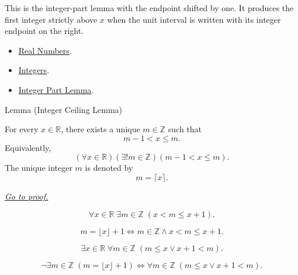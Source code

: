 \begin{remark*}[Interpretation]
This is the integer-part lemma with the endpoint shifted by one.  It produces
the first integer strictly above $x$ when the unit interval is written with its
integer endpoint on the right.
\end{remark*}

\begin{dependencies}
\begin{itemize}
\item \hyperref[def:reals]{Real Numbers}.
\item \hyperref[def:integers]{Integers}.
\item \hyperref[lem:integer-part-lemma]{Integer Part Lemma}.
\end{itemize}
\end{dependencies}



\begin{lemmabox}{Lemma (Integer Ceiling Lemma)}
\begin{lemma}
\label{lem:integer-ceiling-lemma}
For every $x\in\mathbb{R}$, there exists a unique $m\in\mathbb{Z}$ such that
\[
  m-1<x\leq m.
\]
Equivalently,
\[
  (\forall x\in\mathbb{R})(\exists!m\in\mathbb{Z})(m-1<x\leq m).
\]
The unique integer $m$ is denoted by
\[
  m=\lceil x\rceil.
\]

\smallskip
\noindent
\hyperref[prf:integer-ceiling-lemma]{\textit{Go to proof.}}
\end{lemma}
\end{lemmabox}

\begin{remark*}
\[
\forall x\in\mathbb{R}\;\exists m\in\mathbb{Z}\;(x<m\le x+1).
\]
\end{remark*}

\begin{remark*}
\[
m=\lfloor x\rfloor+1
\Longleftrightarrow
m\in\mathbb{Z}\land x<m\le x+1.
\]
\end{remark*}

\begin{remark*}
\[
\exists x\in\mathbb{R}\;\forall m\in\mathbb{Z}\;(m\le x\lor x+1<m).
\]
\end{remark*}

\begin{remark*}
\[
\neg\exists m\in\mathbb{Z}\;(m=\lfloor x\rfloor+1)
\Longleftrightarrow
\forall m\in\mathbb{Z}\;(m\le x\lor x+1<m).
\]
\end{remark*}

